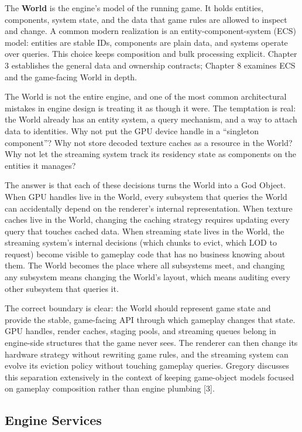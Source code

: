 \documentclass[
  11pt,
  letterpaper,
  DIV=11,
  numbers=noendperiod,
  twoside,
  open=right]{scrreprt}
\begin{document}
The \textbf{World} is the engine's model of the running game. It holds
entities, components, system state, and the data that game rules are
allowed to inspect and change. A common modern realization is an
entity-component-system (ECS) model: entities are stable IDs, components
are plain data, and systems operate over queries. This choice keeps
composition and bulk processing explicit. Chapter 3 establishes the
general data and ownership contracts; Chapter 8 examines ECS and the
game-facing World in depth.

The World is not the entire engine, and one of the most common
architectural mistakes in engine design is treating it as though it
were. The temptation is real: the World already has an entity system, a
query mechanism, and a way to attach data to identities. Why not put the
GPU device handle in a ``singleton component''? Why not store decoded
texture caches as a resource in the World? Why not let the streaming
system track its residency state as components on the entities it
manages?

The answer is that each of these decisions turns the World into a God
Object. When GPU handles live in the World, every subsystem that queries
the World can accidentally depend on the renderer's internal
representation. When texture caches live in the World, changing the
caching strategy requires updating every query that touches cached data.
When streaming state lives in the World, the streaming system's internal
decisions (which chunks to evict, which LOD to request) become visible
to gameplay code that has no business knowing about them. The World
becomes the place where all subsystems meet, and changing any subsystem
means changing the World's layout, which means auditing every other
subsystem that queries it.

The correct boundary is clear: the World should represent game state and
provide the stable, game-facing API through which gameplay changes that
state. GPU handles, render caches, staging pools, and streaming queues
belong in engine-side structures that the game never sees. The renderer
can then change its hardware strategy without rewriting game rules, and
the streaming system can evolve its eviction policy without touching
gameplay queries. Gregory discusses this separation extensively in the
context of keeping game-object models focused on gameplay composition
rather than engine plumbing {[}3{]}.

\subsection{Engine Services}\label{engine-services}
\end{document}
